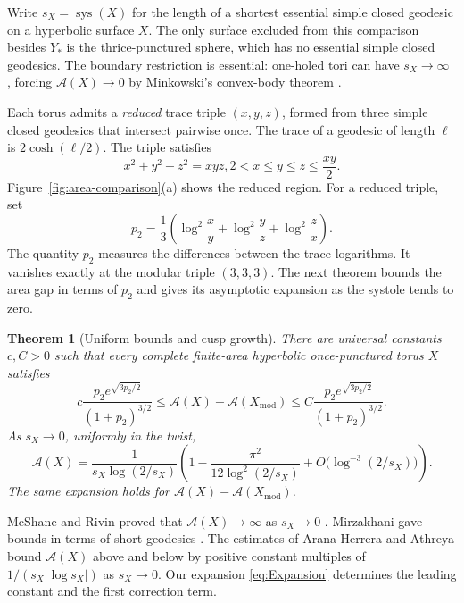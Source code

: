 \documentclass[10pt,twoside]{article}
\theoremstyle{plain}
\newtheorem{theorem}{Theorem}[section]
\theoremstyle{definition}
\theoremstyle{remark}
\DeclareMathOperator{\sys}{sys}
\newcommand{\A}{\mathcal A}
\newcommand{\Xmod}{X_{\mathrm{mod}}}
\begin{document}
Write $s_X=\sys(X)$ for the length of a shortest essential
simple closed geodesic on a hyperbolic surface $X$. The only surface
excluded from this comparison besides $Y_*$ is the thrice-punctured
sphere, which has no essential simple closed geodesics.
The boundary restriction is essential: one-holed tori can have
$s_X\to\infty$ \cite{Schmutz}, forcing $\A(X)\to0$ by
Minkowski's convex-body theorem
\cite[Theorem II, p.~71]{Cassels}.

Each torus admits a \emph{reduced} trace triple $(x,y,z)$,
formed from three simple closed geodesics that intersect pairwise
once. The trace of a geodesic of length $\ell$ is $2\cosh(\ell/2)$.
The triple satisfies
\begin{equation}\label{eq:Reduceness}
x^2+y^2+z^2=xyz,
2<x\leq y\leq z\leq\frac{xy}{2}. 
\end{equation}
Figure~\ref{fig:area-comparison}(a) shows the reduced region.
For a reduced triple, set
\begin{equation}\label{eq:p_2}
p_2=\frac13\left(
\log^2\frac{x}{y}+\log^2\frac{y}{z}+\log^2\frac{z}{x}\right).
\end{equation}
The quantity $p_2$ measures the differences between the trace
logarithms. It vanishes exactly at the modular triple $(3,3,3)$.
The next theorem bounds the area gap in terms of $p_2$ and gives
its asymptotic expansion as the systole tends to zero.

\begin{theorem}[Uniform bounds and cusp growth]
\label{thm:quantitative-area}
There are universal constants $c,C>0$ such that every complete
finite-area hyperbolic once-punctured torus $X$ satisfies
$$
c\frac{p_2e^{\sqrt{3p_2/2}}}{(1+p_2)^{3/2}}
\leq\A(X)-\A(\Xmod)
\leq C\frac{p_2e^{\sqrt{3p_2/2}}}{(1+p_2)^{3/2}}.
$$
As $s_X\to0$, uniformly in the twist,
\begin{equation}\label{eq:Expansion}
\A(X)=\frac{1}{s_X\log(2/s_X)}
\left(1-\frac{\pi^2}{12\log^2(2/s_X)}
+O\bigl(\log^{-3}(2/s_X)\bigr)\right).
\end{equation}
The same expansion holds for $\A(X)-\A(\Xmod)$.
\end{theorem}

McShane and Rivin proved that $\A(X)\to\infty$ as $s_X\to0$
\cite[Theorem~3.2]{McShaneRivinTori}.
Mirzakhani gave bounds in terms of short geodesics
\cite[Proposition~3.6]{MirzakhaniGrowth}. The estimates of Arana-Herrera and
Athreya \cite[Theorem~1.5]{AranaHerreraAthreya} bound $\A(X)$
above and below by positive constant multiples of
$1/(s_X|\log s_X|)$ as $s_X\to0$.
Our expansion \eqref{eq:Expansion} determines the leading constant and the first
correction term.
\end{document}
